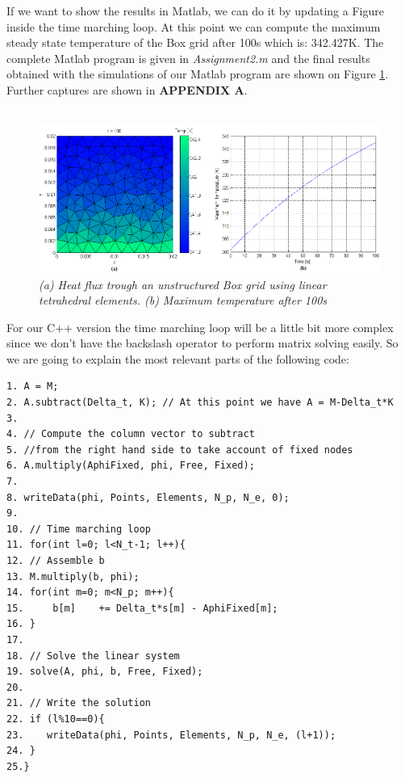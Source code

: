 \documentclass[12pt]{article}
\begin{document}
If we want to show the results in Matlab, we can do it by updating a Figure inside the time marching loop. At this point we can compute the maximum steady state temperature of the Box grid after 100s which is: 342.427K. The complete Matlab program is given in \textit{Assignment2.m} and the final results obtained with the simulations of our Matlab program are shown on Figure \ref{fig:matlab1}. Further captures are shown in \textbf{APPENDIX A}.
\\\\
\begin{figure}[h!]
    \includegraphics[scale=0.6]{matlab1}
    \caption{\textit{(a) Heat flux trough an unstructured Box grid using linear tetrahedral elements. (b) Maximum temperature after 100s}}
    \label{fig:matlab1}
\end{figure}

For our C++ version the time marching loop will be a little bit more complex since we don't have the backslash operator to perform matrix solving easily. So we are going to explain the most relevant parts of the following code:

\begin{lstlisting}[style=MyC++Style] 
1. A = M;
2. A.subtract(Delta_t, K); // At this point we have A = M-Delta_t*K
3.
4. // Compute the column vector to subtract 
5. //from the right hand side to take account of fixed nodes
6. A.multiply(AphiFixed, phi, Free, Fixed);
7.
8. writeData(phi, Points, Elements, N_p, N_e, 0);
9. 
10. // Time marching loop
11. for(int l=0; l<N_t-1; l++){
12.	// Assemble b
13.	M.multiply(b, phi);
14.	for(int m=0; m<N_p; m++){
15.		b[m]	+= Delta_t*s[m] - AphiFixed[m];
16.	}
17.
18.	// Solve the linear system
19.	solve(A, phi, b, Free, Fixed);
20.
21.	// Write the solution
22.	if (l%10==0){
23.	   writeData(phi, Points, Elements, N_p, N_e, (l+1));
24.	}
25.}
\end{lstlisting}
\end{document}
